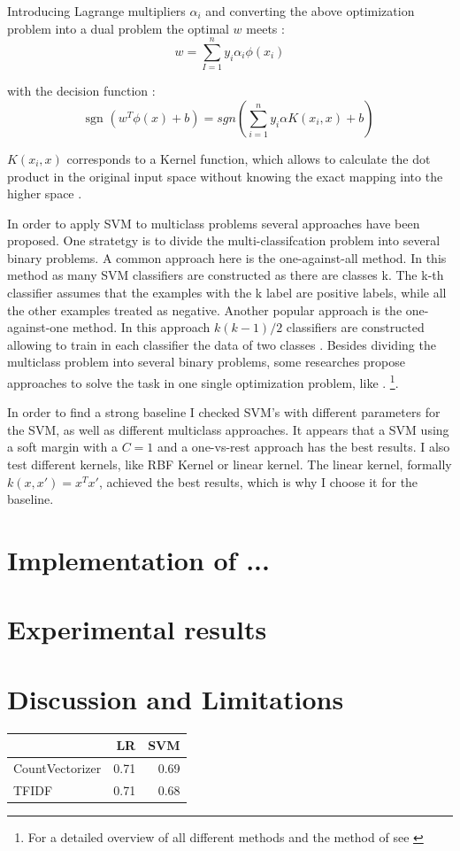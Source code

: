 \documentclass[12pt, a4paper, titlepage]{article}
\begin{document}
Introducing Lagrange multipliers $\alpha_i$ and converting the above optimization problem into a dual problem the optimal $w$ meets \citep{Chang2001, Jordan2006}:
\[w = \sum_{I=1}^n y_i\alpha_i\phi(x_i)\]

with the decision function \citep{Chang2001}:
\[\text{sgn } (w^T\phi(x)+b) = sgn(\sum_{i=1}^n y_i \alpha K(x_i, x) +b)\]

$K(x_i, x)$ corresponds to a Kernel function, which allows to calculate the dot product in the original input space without knowing the exact mapping into the higher space \citep{Han2012, Jordan2006}. 

In order to apply \ac{SVM} to multiclass problems several approaches have been proposed. One stratetgy is to divide the multi-classifcation problem into several binary problems. A common approach here is the one-against-all method. In this method as many \ac{SVM} classifiers are constructed as there are classes k. The k-th classifier assumes that the examples with the k label are positive labels, while all the other examples treated as negative. Another popular approach is the one-against-one method. In this approach $k(k-1)/2$ classifiers are constructed allowing to train in each classifier the data of two classes \citep{Hsu2002}. Besides dividing the multiclass problem into several binary problems, some researches propose approaches to solve the task in one single optimization problem, like \citet{Crammer2001}. \footnote{For a detailed overview of all different methods and the method of \citet{Crammer2001} see \citet{Hsu2002,Crammer2001}}. 

In order to find a strong baseline I checked \ac{SVM}'s with different parameters for the \ac{SVM}, as well as different multiclass approaches. It appears that a SVM using a soft margin with a $C=1$ and a one-vs-rest approach has the best results. I also test different kernels, like  RBF Kernel or linear kernel. The linear kernel, formally  $k(x, x') = x^Tx'$, achieved the best results, which is why I choose it for the baseline. 

\section{Implementation of ...}

\section{Experimental results}
\section{Discussion and Limitations}
\begin{tabular}{|l|r|r}
  \hline
  {} &    LR &   SVM \\
  \hline
  CountVectorizer &  0.71 &  0.69 \\
  TFIDF           &  0.71 &  0.68 \\
  \hline
  \end{tabular}
\end{document}
